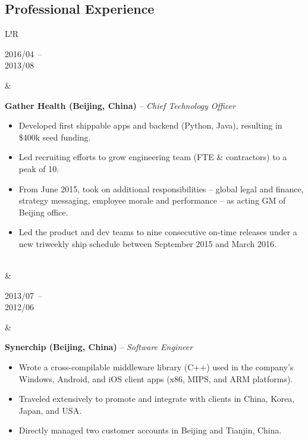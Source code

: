 \documentclass[10pt]{article}
\newcommand\VRule{\color{lightgray}\vrule width 0.5pt}
\def\spaceBetweenExperienceEntries{\vspace{8pt}&\vspace{8pt}\\}
\def\spaceBeforeExperienceBullets{\vspace{-10pt}}
\begin{document}
\begin{CJK}{UTF8}{gbsn}
\section*{Professional Experience}
\begin{tabular}{L!{\VRule}R}
    \parbox[t]{1.0\linewidth}{
        {\scriptsize 2016/04}~--\\
        {\scriptsize 2013/08}
    }&
    \parbox[t]{1.0\linewidth}{
        {\bf Gather Health (Beijing, China)} -- \textit{Chief Technology Officer}\\
        \spaceBeforeExperienceBullets
        \begin{itemize}[leftmargin=16pt]
            \item Developed first shippable apps and backend (Python, Java), resulting in \$400k seed funding.
            \item Led recruiting efforts to grow engineering team (FTE \& contractors) to a peak of 10.
            \item From June 2015, took on additional responsibilities -- global legal and finance, strategy messaging, employee morale and performance -- as acting GM of Beijing office.
            \item Led the product and dev teams to nine consecutive on-time releases under a new triweekly ship schedule between September 2015 and March 2016.
        \end{itemize}
    }\\

    \spaceBetweenExperienceEntries

    \parbox[t]{1.0\linewidth}{
        {\scriptsize 2013/07}~--\\
        {\scriptsize 2012/06}
    }&
    \parbox[t]{1.0\linewidth}{
        {\bf Synerchip (Beijing, China)} -- \textit{Software Engineer}\\
        \spaceBeforeExperienceBullets
        \begin{itemize}[leftmargin=16pt]
            \item Wrote a cross-compilable middleware library (C++) used in the company's Windows, Android, and iOS client apps (x86, MIPS, and ARM platforms).
            \item Traveled extensively to promote and integrate with clients in China, Korea, Japan, and USA.
            \item Directly managed two customer accounts in Beijing and Tianjin, China.
        \end{itemize}
    }\\


\end{tabular}
\end{CJK}
\end{document}
